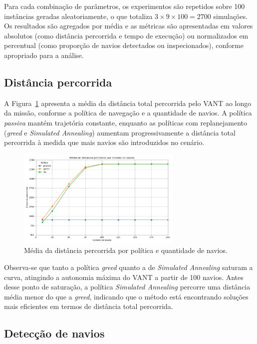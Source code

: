 Para cada combinação de parâmetros, os experimentos são repetidos sobre 100 instâncias geradas aleatoriamente, o que totaliza $3 \times 9 \times 100 = 2700$ simulações. Os resultados são agregados por média e as métricas são apresentadas em valores absolutos (como distância percorrida e tempo de execução) ou normalizados em percentual (como proporção de navios detectados ou inspecionados), conforme apropriado para a análise.

\subsection{Distância percorrida}

A Figura~\ref{fig:distancia} apresenta a média da distância total percorrida pelo VANT ao longo da missão, conforme a política de navegação e a quantidade de navios. A política \textit{passiva} mantém trajetória constante, enquanto as políticas com replanejamento (\textit{greed} e \textit{Simulated Annealing}) aumentam progressivamente a distância total percorrida à medida que mais navios são introduzidos no cenário.

\begin{figure}[H]
    \centering
    \includegraphics[width=0.7\textwidth]{fig/resultado_dis.png}
    \caption{Média da distância percorrida por política e quantidade de navios.}
    \label{fig:distancia}
\end{figure}

Observa-se que tanto a política \textit{greed} quanto a de \textit{Simulated Annealing} saturam a curva, atingindo a autonomia máxima do VANT a partir de 100 navios. Antes desse ponto de saturação, a política \textit{Simulated Annealing} percorre uma distância média menor do que a \textit{greed}, indicando que o método está encontrando soluções mais eficientes em termos de distância total percorrida.

\subsection{Detecção de navios}

